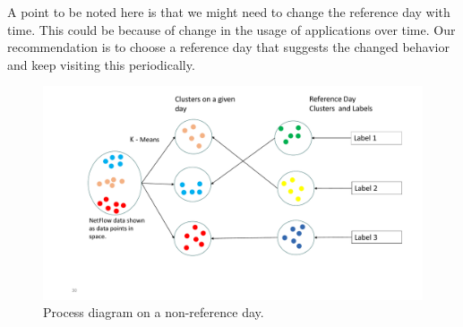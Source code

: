 A point to be noted here is that we might need to change the reference day with time. This could be because of change in the usage of applications over time. Our recommendation is to choose a reference day that suggests the changed behavior and keep visiting this periodically.

 \begin{figure}[b]
	\centerline{\includegraphics[scale = 0.5]{assign_prob.pdf}}
	\caption{Process diagram on a non-reference day.}%
\end{figure}
